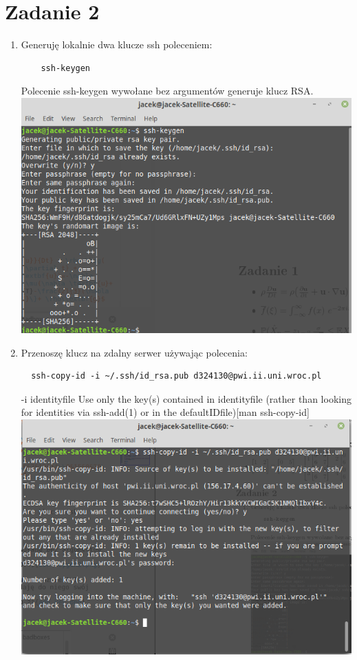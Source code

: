 \documentclass{article}
\begin{document}
\section*{Zadanie 2}
\begin{enumerate}
 \item Generuję lokalnie dwa klucze ssh poleceniem: 
 \begin{verbatim}
    ssh-keygen
 \end{verbatim}
 Polecenie ssh-keygen wywołane bez argumentów generuje klucz RSA.\\
 \includegraphics[scale=0.4]{ssh-keygen2.png}
 \item Przenoszę klucz na zdalny serwer używając polecenia:
 \begin{verbatim}
  ssh-copy-id -i ~/.ssh/id_rsa.pub d324130@pwi.ii.uni.wroc.pl
 \end{verbatim}
 -i identityfile Use only the key(s) contained in identityfile (rather than looking for identities via ssh-add(1) or in the defaultIDfile)[man ssh-copy-id]
 \\
 \includegraphics[scale=0.4]{ssh-copy-id2.png}


\end{enumerate}
\end{document}
